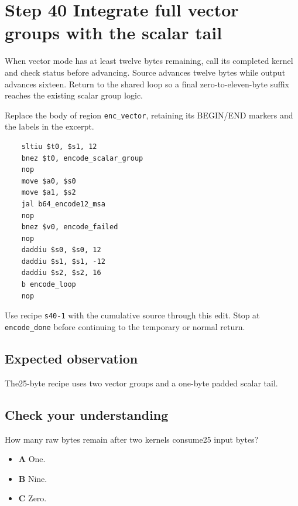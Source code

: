 \section{Step 40 Integrate full vector groups with the scalar tail}\label{base64-s40}

When vector mode has at least twelve bytes remaining, call its completed kernel and check status before advancing. Source advances twelve bytes while output advances sixteen. Return to the shared loop so a final zero-to-eleven-byte suffix reaches the existing scalar group logic.

Replace the body of region \texttt{enc\_vector}, retaining its BEGIN/END markers and the labels in the excerpt.

\begin{verbatim}
    sltiu $t0, $s1, 12
    bnez $t0, encode_scalar_group
    nop
    move $a0, $s0
    move $a1, $s2
    jal b64_encode12_msa
    nop
    bnez $v0, encode_failed
    nop
    daddiu $s0, $s0, 12
    daddiu $s1, $s1, -12
    daddiu $s2, $s2, 16
    b encode_loop
    nop
\end{verbatim}

Use recipe \texttt{s40-1} with the cumulative source through this edit. Stop at \texttt{encode\_done} before continuing to the temporary or normal return.

\subsection{Expected observation}
The25-byte recipe uses two vector groups and a one-byte padded scalar tail.

\subsection{Check your understanding}
How many raw bytes remain after two kernels consume25 input bytes?

\begin{itemize}
  \item \textbf{A} One.
  \item \textbf{B} Nine.
  \item \textbf{C} Zero.
\end{itemize}
